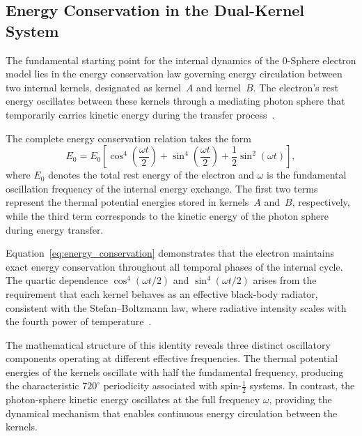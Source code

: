 \documentclass[%
 reprint,
 amsmath,amssymb,
 aps,
 prb,
]{revtex4-2}
\numberwithin{equation}{section}
\begin{document}
\subsection{Energy Conservation in the Dual-Kernel System}
\label{subsec:energy_conservation}

The fundamental starting point for the internal dynamics of the 0-Sphere electron model lies in the energy conservation law governing energy circulation between two internal kernels, designated as kernel~$A$ and kernel~$B$. The electron’s rest energy oscillates between these kernels through a mediating photon sphere that temporarily carries kinetic energy during the transfer process~\cite{hanamura16759284}.

The complete energy conservation relation takes the form
\begin{equation}
\boxed{E_0
= E_0\!\left[
\cos^4\!\left(\frac{\omega t}{2}\right)
+ \sin^4\!\left(\frac{\omega t}{2}\right)
+ \frac{1}{2}\sin^2(\omega t)
\right]},
\label{eq:energy_conservation}
\end{equation}
where $E_0$ denotes the total rest energy of the electron and $\omega$ is the fundamental oscillation frequency of the internal energy exchange. The first two terms represent the thermal potential energies stored in kernels~$A$ and~$B$, respectively, while the third term corresponds to the kinetic energy of the photon sphere during energy transfer.

Equation~\eqref{eq:energy_conservation} demonstrates that the electron maintains exact energy conservation throughout all temporal phases of the internal cycle. The quartic dependence $\cos^4(\omega t/2)$ and $\sin^4(\omega t/2)$ arises from the requirement that each kernel behaves as an effective black-body radiator, consistent with the Stefan--Boltzmann law, where radiative intensity scales with the fourth power of temperature~\cite{hanamura17765097}.

The mathematical structure of this identity reveals three distinct oscillatory components operating at different effective frequencies. The thermal potential energies of the kernels oscillate with half the fundamental frequency, producing the characteristic $720^\circ$ periodicity associated with spin-$\tfrac{1}{2}$ systems. In contrast, the photon-sphere kinetic energy oscillates at the full frequency $\omega$, providing the dynamical mechanism that enables continuous energy circulation between the kernels.
\end{document}
